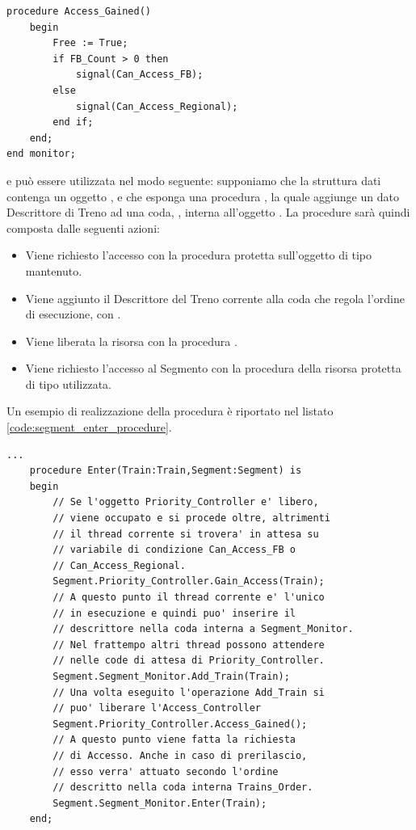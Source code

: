\begin{description}
\begin{lstlisting}[caption=\small{monitor utilizzato per garantire accesso preferenziale a Treni di tipo \ttt{FB}.}, label=priority_access_controller]
	procedure Access_Gained()
	begin
		Free := True;
		if FB_Count > 0 then
			signal(Can_Access_FB);
		else
			signal(Can_Access_Regional);
		end if;
	end;
end monitor;
\end{lstlisting}
			
			e può essere utilizzata nel modo seguente: supponiamo che la struttura dati  contenga un oggetto , e che esponga una procedura , la quale aggiunge un dato Descrittore di Treno ad una coda, , interna all'oggetto . La procedure  sarà quindi composta dalle seguenti azioni:
			\begin{itemize}
				\item Viene richiesto l'accesso con la procedura protetta  sull'oggetto di tipo  mantenuto.
				\item Viene aggiunto il Descrittore del Treno corrente alla coda che regola l'ordine di esecuzione, con .
				\item Viene liberata la risorsa  con la procedura .
				\item Viene richiesto l'accesso al Segmento con la procedura  della risorsa protetta di tipo  utilizzata.
			\end{itemize}
		Un esempio di realizzazione della procedura  è riportato nel listato \ref{code:segment_enter_procedure}. 
			
\begin{lstlisting}[label=code:segment_enter_procedure,caption=\small{Esempio di procedura \ttt{Enter} che realizza il protocollo di accesso.}]
	...
	procedure Enter(Train:Train,Segment:Segment) is
	begin
		// Se l'oggetto Priority_Controller e' libero, 
		// viene occupato e si procede oltre, altrimenti 
		// il thread corrente si trovera' in attesa su  
		// variabile di condizione Can_Access_FB o 
		// Can_Access_Regional.
		Segment.Priority_Controller.Gain_Access(Train);
		// A questo punto il thread corrente e' l'unico  
		// in esecuzione e quindi puo' inserire il  
		// descrittore nella coda interna a Segment_Monitor. 
		// Nel frattempo altri thread possono attendere
		// nelle code di attesa di Priority_Controller.
		Segment.Segment_Monitor.Add_Train(Train);
		// Una volta eseguito l'operazione Add_Train si 
		// puo' liberare l'Access_Controller
		Segment.Priority_Controller.Access_Gained();
		// A questo punto viene fatta la richiesta 
		// di Accesso. Anche in caso di prerilascio, 
		// esso verra' attuato secondo l'ordine 
		// descritto nella coda interna Trains_Order.
		Segment.Segment_Monitor.Enter(Train);
	end;
\end{lstlisting}


\end{description}
